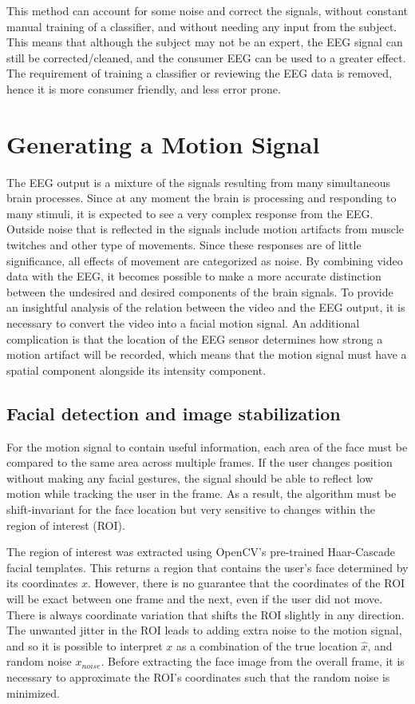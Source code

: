 \documentclass{acm_proc_article-sp}
\begin{document}
This method can account for some noise and correct the signals, without constant
manual training of a classifier, and without needing any input from
the subject. This means that although the subject may not be an expert, the
EEG signal can still be corrected/cleaned, and the consumer EEG can be
used to a greater effect. The requirement of training a classifier or
reviewing the EEG data is removed, hence it is more consumer friendly,
and less error prone.

\section{Generating a Motion Signal}
The EEG output is a mixture of the signals resulting from many
simultaneous brain processes. Since at any moment the brain is
processing and responding to many stimuli, it is expected to see a
very complex response from the EEG. Outside noise that is reflected
in the signals include motion artifacts from muscle twitches and other
type of movements. Since these responses are of little significance,
all effects of movement are categorized as noise. By combining video
data with the EEG, it becomes possible to make a more accurate
distinction between the undesired and desired components of the brain
signals. To provide an insightful analysis of the relation between the
video and the EEG output, it is necessary to convert the video into a
facial motion signal. An additional complication is that the location
of the EEG sensor determines how strong a motion artifact will be
recorded, which means that the motion signal must have a spatial
component alongside its intensity component.

\subsection{Facial detection and image stabilization}
For the motion signal to contain useful information, each area of the
face must be compared to the same area across multiple frames. If the
user changes position without making any facial gestures, the signal
should be able to reflect low motion while tracking the user in the
frame.  As a result, the algorithm must be shift-invariant for the
face location but very sensitive to changes within the region of
interest (ROI).

The region of interest was extracted using OpenCV's pre-trained
Haar-Cascade\cite{haar} facial templates. This returns a region that contains the
user's face determined by its coordinates $x$. However, there is no
guarantee that the coordinates of the ROI will be exact between one
frame and the next, even if the user did not move. There is always
coordinate variation that shifts the ROI slightly in any
direction. The unwanted jitter in the ROI leads to adding extra noise
to the motion signal, and so it is possible to interpret $x$ as a
combination of the true location $\hat{x}$, and random noise
$x_{noise}$. Before extracting the face image from the overall frame,
it is necessary to approximate the ROI's coordinates such that the
random noise is minimized.
\end{document}
